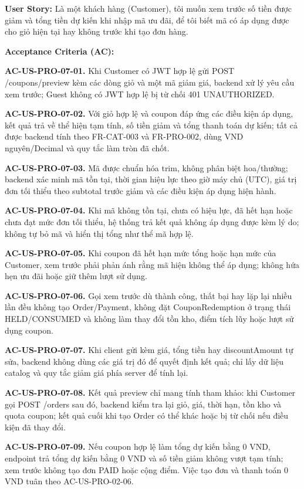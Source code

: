 \documentclass[11pt,a4paper,oneside]{report}
\begin{document}
\textbf{User Story:} Là một khách hàng (Customer), tôi muốn xem trước số tiền được giảm và tổng tiền dự kiến khi nhập mã ưu đãi, để tôi biết mã có áp dụng được cho giỏ hiện tại hay không trước khi tạo đơn hàng.

\textbf{Acceptance Criteria (AC):}

\textbf{AC-US-PRO-07-01.} Khi Customer có JWT hợp lệ gửi POST /coupons/preview kèm các dòng giỏ và một mã giảm giá, backend xử lý yêu cầu xem trước; Guest không có JWT hợp lệ bị từ chối 401 UNAUTHORIZED.

\textbf{AC-US-PRO-07-02.} Với giỏ hợp lệ và coupon đáp ứng các điều kiện áp dụng, kết quả trả về thể hiện tạm tính, số tiền giảm và tổng thanh toán dự kiến; tất cả được backend tính theo FR-CAT-003 và FR-PRO-002, dùng VND nguyên/Decimal và quy tắc làm tròn đã chốt.

\textbf{AC-US-PRO-07-03.} Mã được chuẩn hóa trim, không phân biệt hoa/thường; backend xác minh mã tồn tại, thời gian hiệu lực theo giờ máy chủ (UTC), giá trị đơn tối thiểu theo subtotal trước giảm và các điều kiện áp dụng hiện hành.

\textbf{AC-US-PRO-07-04.} Khi mã không tồn tại, chưa có hiệu lực, đã hết hạn hoặc chưa đạt mức đơn tối thiểu, hệ thống trả kết quả không áp dụng được kèm lý do; không tự bỏ mã và hiển thị tổng như thể mã hợp lệ.

\textbf{AC-US-PRO-07-05.} Khi coupon đã hết hạn mức tổng hoặc hạn mức của Customer, xem trước phải phản ánh rằng mã hiện không thể áp dụng; không hứa hẹn ưu đãi hoặc giữ thêm lượt sử dụng.

\textbf{AC-US-PRO-07-06.} Gọi xem trước dù thành công, thất bại hay lặp lại nhiều lần đều không tạo Order/Payment, không đặt CouponRedemption ở trạng thái HELD/CONSUMED và không làm thay đổi tồn kho, điểm tích lũy hoặc lượt sử dụng coupon.

\textbf{AC-US-PRO-07-07.} Khi client gửi kèm giá, tổng tiền hay discountAmount tự sửa, backend không dùng các giá trị đó để quyết định kết quả; chỉ lấy dữ liệu catalog và quy tắc giảm giá phía server để tính lại.

\textbf{AC-US-PRO-07-08.} Kết quả preview chỉ mang tính tham khảo: khi Customer gọi POST /orders sau đó, backend kiểm tra lại giỏ, giá, thời hạn, tồn kho và quota coupon; kết quả cuối khi tạo Order có thể khác hoặc bị từ chối nếu điều kiện đã thay đổi.

\textbf{AC-US-PRO-07-09.} Nếu coupon hợp lệ làm tổng dự kiến bằng 0 VND, endpoint trả tổng dự kiến bằng 0 VND và số tiền giảm không vượt tạm tính; xem trước không tạo đơn PAID hoặc cộng điểm. Việc tạo đơn và thanh toán 0 VND tuân theo AC-US-PRO-02-06.
\end{document}
